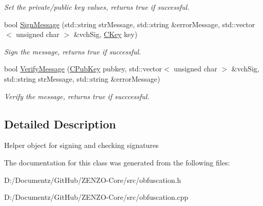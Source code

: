 \begin{DoxyCompactItemize}
\begin{DoxyCompactList}\small\item\em Set the private/public key values, returns true if successful. \end{DoxyCompactList}\item 
\mbox{\label{class_c_obfu_scation_signer_a004eab16d18045b42d51037eab817585}} 
bool \mbox{\hyperlink{class_c_obfu_scation_signer_a004eab16d18045b42d51037eab817585}{Sign\+Message}} (std\+::string str\+Message, std\+::string \&error\+Message, std\+::vector$<$ unsigned char $>$ \&vch\+Sig, \mbox{\hyperlink{class_c_key}{C\+Key}} key)
\begin{DoxyCompactList}\small\item\em Sign the message, returns true if successful. \end{DoxyCompactList}\item 
\mbox{\label{class_c_obfu_scation_signer_aaf770086b8defa6568da76bee8fb5269}} 
bool \mbox{\hyperlink{class_c_obfu_scation_signer_aaf770086b8defa6568da76bee8fb5269}{Verify\+Message}} (\mbox{\hyperlink{class_c_pub_key}{C\+Pub\+Key}} pubkey, std\+::vector$<$ unsigned char $>$ \&vch\+Sig, std\+::string str\+Message, std\+::string \&error\+Message)
\begin{DoxyCompactList}\small\item\em Verify the message, returns true if succcessful. \end{DoxyCompactList}\end{DoxyCompactItemize}


\subsection{Detailed Description}
Helper object for signing and checking signatures 

The documentation for this class was generated from the following files\+:\begin{DoxyCompactItemize}
\item 
D\+:/\+Documentz/\+Git\+Hub/\+Z\+E\+N\+Z\+O-\/\+Core/src/obfuscation.\+h\item 
D\+:/\+Documentz/\+Git\+Hub/\+Z\+E\+N\+Z\+O-\/\+Core/src/obfuscation.\+cpp\end{DoxyCompactItemize}
